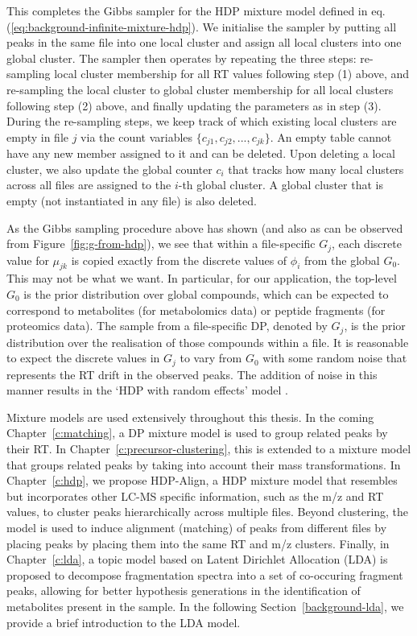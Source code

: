 This completes the Gibbs sampler for the HDP mixture model defined in eq. (\ref{eq:background-infinite-mixture-hdp}). We initialise the sampler by putting all peaks in the same file into one local cluster and assign all local clusters into one global cluster. The sampler then operates by repeating the three steps: re-sampling local cluster membership for all RT values following step (1) above, and re-sampling the local cluster to global cluster membership for all local clusters following step (2) above, and finally updating the parameters as in step (3). During the re-sampling steps, we keep track of which existing local clusters are empty in file $j$ via the count variables $\{c_{j1}, c_{j2}, ..., c_{jk}\}$. An empty table cannot have any new member assigned to it and can be deleted. Upon deleting a local cluster, we also update the global counter $c_{i}$ that tracks how many local clusters across all files are assigned to the $i$-th global cluster. A global cluster that is empty (not instantiated in any file) is also deleted. 

As the Gibbs sampling procedure above has shown (and also as can be observed from Figure~\ref{fig:g-from-hdp}), we see that within a file-specific $G_j$, each discrete value for $\mu_{jk}$ is copied exactly from the discrete values of $\phi_i$ from the global $G_0$. This may not be what we want. In particular, for our application, the top-level $G_0$ is the prior distribution over global compounds, which can be expected to correspond to metabolites (for metabolomics data) or peptide fragments (for proteomics data). The sample from a file-specific DP, denoted by $G_j$, is the prior distribution over the realisation of those compounds within a file. It is reasonable to expect the discrete values in $G_j$ to vary from $G_0$ with some random noise that represents the RT drift in the observed peaks. The addition of noise in this manner results in the `HDP with random effects' model \cite{kim2006hierarchical}. 

Mixture models are used extensively throughout this thesis. In the coming Chapter~\ref{c:matching}, a DP mixture model is used to group related peaks by their RT. In Chapter~\ref{c:precursor-clustering}, this is extended to a mixture model that groups related peaks by taking into account their mass transformations. In Chapter~\ref{c:hdp}, we propose HDP-Align, a HDP mixture model that resembles \cite{kim2006hierarchical} but incorporates other LC-MS specific information, such as the m/z and RT values, to cluster peaks hierarchically across multiple files. Beyond clustering, the model is used to induce alignment (matching) of peaks from different files by placing peaks by placing them into the same RT and m/z clusters. Finally, in Chapter~\ref{c:lda}, a topic model based on Latent Dirichlet Allocation (LDA) is proposed to decompose fragmentation spectra into a set of co-occuring fragment peaks, allowing for better hypothesis generations in the identification of metabolites present in the sample. In the following Section~\ref{background-lda}, we provide a brief introduction to the LDA model. 

